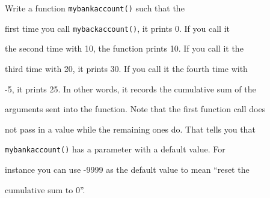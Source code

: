 Write a function \texttt{mybankaccount()} such that the

first time you call \texttt{mybackaccount()}, it prints 0. If you call it

the second time with 10, the function prints 10. If you call it the

third time with 20, it prints 30. If you call it the fourth time with

-5, it prints 25. In other words, it records the cumulative sum of the

arguments sent into the function. Note that the first function call does

not pass in a value while the remaining ones do. That tells you that

\texttt{mybankaccount()} has a parameter with a default value. For

instance you can use -9999 as the default value to mean ``reset the

cumulative sum to 0''.

